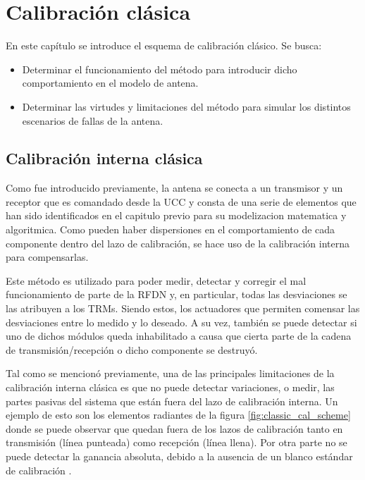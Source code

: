 
\chapter{Calibración clásica}
\label{ch:classicalCalibration}

En este capítulo se introduce el esquema de calibración clásico. Se busca:
\begin{itemize}
	\item Determinar el funcionamiento del método para introducir dicho comportamiento en el modelo de antena. 
	\item Determinar las virtudes y limitaciones del método para simular los distintos escenarios de fallas de la antena.
\end{itemize}


\section{Calibración interna clásica}

Como fue introducido previamente, la antena se conecta a un transmisor y un receptor que es comandado desde la UCC y consta de
una serie de elementos que han sido identificados en el capitulo previo para su modelizacion matematica y algoritmica. Como 
pueden haber dispersiones en el comportamiento de cada componente dentro del lazo de calibración, se hace uso de la calibración
interna para compensarlas. 

Este método es utilizado para poder medir, detectar y corregir el mal funcionamiento de parte de la RFDN y, en particular, todas
las desviaciones se las atribuyen a los TRMs. Siendo estos, los actuadores que permiten comensar las desviaciones entre lo medido
y lo deseado. A su vez, también se puede detectar si uno de dichos módulos queda inhabilitado a causa que cierta parte de la
cadena de transmisión/recepción o dicho componente se destruyó.

Tal como se mencionó previamente, una de las principales limitaciones de la calibración interna clásica es que no puede
detectar variaciones, o medir, las partes pasivas del sistema que están fuera del lazo de calibración interna. Un ejemplo de
esto son los elementos radiantes de la figura \ref{fig:classic_cal_scheme} donde se puede observar que quedan fuera de los lazos
de calibración tanto en transmisión (línea punteada) como recepción (línea llena). Por otra parte no se puede detectar la
ganancia absoluta, debido a la ausencia de un blanco estándar de calibración \cite{Wang2010}.

